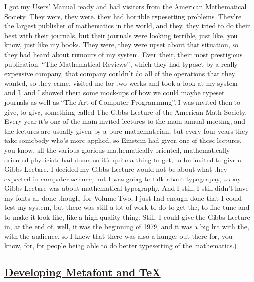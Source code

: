 \documentclass[]{article}
\begin{document}
I got my Users' Manual ready and had visitors from the American
Mathematical Society. They were, they were, they had horrible
typesetting problems. They're the largest publisher of mathematics in
the world, and they, they tried to do their best with their journals,
but their journals were looking terrible, just like, you know, just like
my books. They were, they were upset about that situation, so they had
heard about rumours of my system. Even their, their most prestigious
publication, ``The Mathematical Reviews'', which they had typeset by a
really expensive company, that company couldn't do all of the operations
that they wanted, so they came, visited me for two weeks and took a look
at my system and I, and I showed them some mock-ups of how we could
maybe typeset journals as well as ``The Art of Computer Programming''. I
was invited then to give, to give, something called The Gibbs Lecture of
the American Math Society. Every year it's one of the main invited
lectures to the main annual meeting, and the lectures are usually given
by a pure mathematician, but every four years they take somebody who's
more applied, so Einstein had given one of these lectures, you know, all
the various glorious mathematically oriented, mathematically oriented
physicists had done, so it's quite a thing to get, to be invited to give
a Gibbs Lecture. I decided my Gibbs Lecture would not be about what they
expected in computer science, but I was going to talk about typography,
so my Gibbs Lecture was about mathematical typography. And I still, I
still didn't have my fonts all done though, for Volume Two, I just had
enough done that I could test my system, but there was still a lot of
work to do to get the, to fine tune and to make it look like, like a
high quality thing. Still, I could give the Gibbs Lecture in, at the end
of, well, it was the beginning of 1979, and it was a big hit with the,
with the audience, so I knew that there was also a hunger out there for,
you know, for, for people being able to do better typesetting of the
mathematics.)

\subsection{\texorpdfstring{\href{http://webofstories.com/play/17121}{Developing
Metafont and
TeX}}{Developing Metafont and TeX}}\label{developing-metafont-and-tex}
\end{document}
